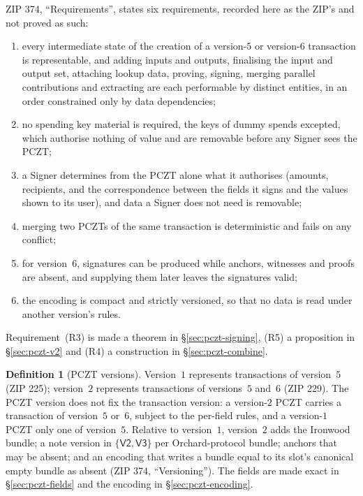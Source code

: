 \documentclass[11pt,a4paper]{article}
\theoremstyle{definition}
\newtheorem{definition}[theorem]{Definition}
\begin{document}
ZIP 374, ``Requirements'', states six requirements, recorded here as the
ZIP's and not proved as such:
\begin{enumerate}[label=(R\arabic*)]
\item every intermediate state of the creation of a version-$5$ or
  version-$6$ transaction is representable, and adding inputs and outputs,
  finalising the input and output set, attaching lookup data, proving,
  signing, merging parallel contributions and extracting are each
  performable by distinct entities, in an order constrained only by data
  dependencies;
\item no spending key material is required, the keys of dummy spends
  excepted, which authorise nothing of value and are removable before any
  Signer sees the PCZT;
\item a Signer determines from the PCZT alone what it authorises (amounts,
  recipients, and the correspondence between the fields it signs and the
  values shown to its user), and data a Signer does not need is removable;
\item merging two PCZTs of the same transaction is deterministic and fails
  on any conflict;
\item for version~$6$, signatures can be produced while anchors, witnesses
  and proofs are absent, and supplying them later leaves the signatures
  valid;
\item the encoding is compact and strictly versioned, so that no data is
  read under another version's rules.
\end{enumerate}
Requirement~(R3) is made a theorem in \S\ref{sec:pczt-signing}, (R5) a
proposition in \S\ref{sec:pczt-v2} and (R4) a construction in
\S\ref{sec:pczt-combine}.

\begin{definition}[PCZT versions]\label{def:pczt-versions}
Version~$1$ represents transactions of version~$5$ (ZIP 225); version~$2$
represents transactions of versions~$5$ and~$6$ (ZIP 229). The PCZT version
does not fix the transaction version: a version-$2$ PCZT carries a
transaction of version~$5$ or~$6$, subject to the per-field rules, and a
version-$1$ PCZT only one of version~$5$. Relative to version~$1$,
version~$2$ adds the Ironwood bundle; a note version in
$\{\mathsf{V2}, \mathsf{V3}\}$ per Orchard-protocol bundle; anchors that may
be absent; and an encoding that writes a bundle equal to its slot's
canonical empty bundle as absent (ZIP 374, ``Versioning''). The fields are
made exact in \S\ref{sec:pczt-fields} and the encoding in
\S\ref{sec:pczt-encoding}.
\end{definition}
\end{document}
